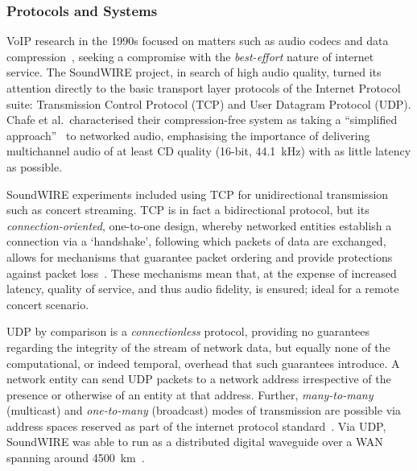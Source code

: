 \subsubsection{Protocols and Systems}\label{subsubsec:protocols-systems}

VoIP research in the 1990s focused on matters such as audio codecs and data
compression~\citep{turletti_inria_1995,hardman_successful_1998}, seeking a
compromise with the \textit{best-effort} nature of internet service.
The SoundWIRE project, in search of high audio quality, turned its attention
directly to the basic transport layer protocols of the Internet Protocol suite:
Transmission Control Protocol (TCP) and User Datagram Protocol (UDP).
Chafe et al.\ characterised their compression-free system as taking a
``simplified approach''~\citep{chafe_simplified_2000} to networked audio,
emphasising the importance of delivering multichannel audio of at least CD
quality (16-bit, \qty{44.1}{\kHz}) with as little latency as possible.

SoundWIRE experiments included using TCP for unidirectional transmission such as
concert streaming.
TCP is in fact a bidirectional protocol, but its \textit{connection-oriented},
one-to-one design, whereby networked entities establish a connection via a
`handshake', following which packets of data are exchanged, allows for
mechanisms that guarantee packet ordering and provide protections against packet
loss~\citep{schiavoni_alternatives_2013,al-dhief_performance_2018}.
These mechanisms mean that, at the expense of increased latency, quality of
service, and thus audio fidelity, is ensured; ideal for a remote concert
scenario.

UDP by comparison is a \textit{connectionless} protocol, providing no guarantees
regarding the integrity of the stream of network data, but equally none of the
computational, or indeed temporal, overhead that such guarantees introduce.
A network entity can send UDP packets to a network address irrespective of
the presence or otherwise of an entity at that address.
Further, \textit{many-to-many} (multicast) and \textit{one-to-many} (broadcast)
modes of transmission are possible via address spaces reserved as part of the
internet protocol standard~\citep{meyer_iana_2010}.
Via UDP, SoundWIRE was able to run as a distributed digital waveguide over a
WAN spanning around \qty{4500}{\km}~\citep{chafe_simplified_2000}.

